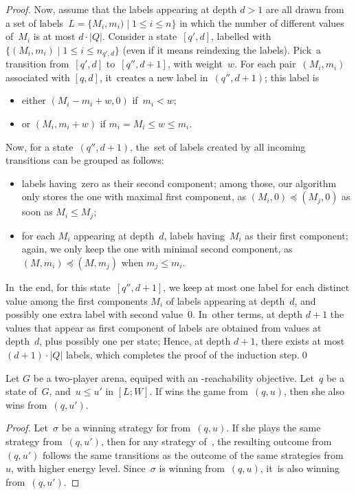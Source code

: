 \begin{proof}
Now, assume that the labels appearing 
at depth $d>1$ are all drawn from a set of labels~$L=\{M_i,m_i) \mid 1\leq i\leq n\}$ in which the
number of different values of~$M_i$ is at most $d\cdot|Q|$.
Consider a state~$[q',d]$, labelled with $\{(M_i,m_i) \mid 1\leq i\leq
n_{q',d}\}$ (even if it means reindexing the labels). Pick~a
transition from~$[q',d]$ to~$[q'',d+1]$, with weight~$w$. For each
pair~$(M_i,m_i)$ associated with $[q,d]$, it~creates a new label in~$(q'',d+1)$; this label
is
\begin{itemize}
\item either $(M_i-m_i+w,0)$ if~$m_i<w$;
\item or $(M_i,m_i+w)$ if $m_i=M_i\leq w\leq m_i$.
\end{itemize}
Now, for a state~$(q'',d+1)$, the~set of labels created by all
incoming transitions can be grouped as follows:
\begin{itemize}
\item labels having~zero as their second component; among those, our
  algorithm only stores the one with maximal first component, as $(M_i,0) \preceq (M_j,0)$ as soon as $M_i\leq M_j$;
\item for each $M_i$ appearing at depth~$d$, labels having~$M_i$ as
  their first component; again, we only keep the one with minimal
  second component, as $(M,m_i) \preceq (M,m_j)$ when $m_j \leq m_i$.
\end{itemize}
In~the end, for this state~$[q'',d+1]$, we keep at most one label for
each distinct value among the first components $M_i$ of labels appearing at depth~$d$, and possibly one extra
label with second value~$0$. In~other terms, at depth $d+1$ the values that appear as first component of labels are 
obtained from values at depth~$d$, plus possibly one per state; Hence, at depth $d+1$, there exists at most $(d+1)\cdot|Q|$ labels, which completes the proof of the induction step.\qed
\end{proof}



  Let $G$ be a two-player arena, equiped with an \LWenergy-reachability
  objective. Let~$q$ be a state of~$G$, and~$u\leq u'$ in $[L;W]$. If
   wins the game from~$(q,u)$, then she also wins from~$(q,u')$.

\begin{proof}
Let~$\sigma$ be a winning strategy for  from~$(q,u)$. If she plays
the same strategy from~$(q,u')$, then for any strategy of~, the
resulting outcome from~$(q,u')$ follows the same transitions as the
outcome of the same strategies from~$u$, with higher energy
level. Since~$\sigma$ is winning from~$(q,u)$, it~is also winning
from~$(q,u')$.
\end{proof}

